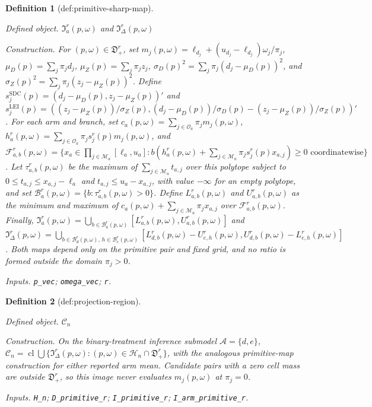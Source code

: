 \documentclass{article}
\newtheorem{definition}{Definition}
\begin{document}
\begin{definition}[def:primitive-sharp-map]\label{def:primitive-sharp-map}
\par\smallskip\noindent\emph{Defined object.} \(\mathfrak I_a^r(p,\omega)\) and \(\mathfrak I_{\Delta}^r(p,\omega)\)
\par\smallskip\noindent\emph{Construction.} For \((p,\omega)\in\mathfrak D_+^r\), set \(m_j(p,\omega)=\ell_{d_j}+(u_{d_j}-\ell_{d_j})\omega_j/\pi_j\), \(\mu_D(p)=\sum_j\pi_jd_j\), \(\mu_Z(p)=\sum_j\pi_jz_j\), \(\sigma_D(p)^2=\sum_j\pi_j(d_j-\mu_D(p))^2\), and \(\sigma_Z(p)^2=\sum_j\pi_j(z_j-\mu_Z(p))^2\). Define \(s_j^{\mathrm{SDC}}(p)=(d_j-\mu_D(p),z_j-\mu_Z(p))'\) and \(s_j^{\mathrm{LEI}}(p)=((z_j-\mu_Z(p))/\sigma_Z(p),(d_j-\mu_D(p))/\sigma_D(p)-(z_j-\mu_Z(p))/\sigma_Z(p))'\). For each arm and branch, set \(c_a(p,\omega)=\sum_{j\in\mathcal O_a}\pi_jm_j(p,\omega)\), \(h_a^r(p,\omega)=\sum_{j\in\mathcal O_a}\pi_js_j^r(p)m_j(p,\omega)\), and \(\mathcal F_{a,b}^r(p,\omega)=\{x_a\in\prod_{j\in\mathcal M_a}[\ell_a,u_a]:b(h_a^r(p,\omega)+\sum_{j\in\mathcal M_a}\pi_js_j^r(p)x_{a,j})\ge0\text{ coordinatewise}\}\). Let \(\tau_{a,b}^r(p,\omega)\) be the maximum of \(\sum_{j\in\mathcal M_a}t_{a,j}\) over this polytope subject to \(0\le t_{a,j}\le x_{a,j}-\ell_a\) and \(t_{a,j}\le u_a-x_{a,j}\), with value \(-\infty\) for an empty polytope, and set \(\mathcal B_a^r(p,\omega)=\{b:\tau_{a,b}^r(p,\omega)>0\}\). Define \(L_{a,b}^r(p,\omega)\) and \(U_{a,b}^r(p,\omega)\) as the minimum and maximum of \(c_a(p,\omega)+\sum_{j\in\mathcal M_a}\pi_jx_{a,j}\) over \(\mathcal F_{a,b}^r(p,\omega)\). Finally, \(\mathfrak I_a^r(p,\omega)=\bigcup_{b\in\mathcal B_a^r(p,\omega)}[L_{a,b}^r(p,\omega),U_{a,b}^r(p,\omega)]\) and \(\mathfrak I_{\Delta}^r(p,\omega)=\bigcup_{b\in\mathcal B_d^r(p,\omega),\,h\in\mathcal B_e^r(p,\omega)}[L_{d,b}^r(p,\omega)-U_{e,h}^r(p,\omega),U_{d,b}^r(p,\omega)-L_{e,h}^r(p,\omega)]\). Both maps depend only on the primitive pair and fixed grid, and no ratio is formed outside the domain \(\pi_j>0\).
\par\smallskip\noindent\emph{Inputs.} \texttt{p\_\allowbreak{}vec}; \texttt{omega\_\allowbreak{}vec}; \texttt{r}.
\end{definition}

\begin{definition}[def:projection-region]\label{def:projection-region}
\par\smallskip\noindent\emph{Defined object.} \(\mathcal C_n\)
\par\smallskip\noindent\emph{Construction.} On the binary-treatment inference submodel \(\mathcal A=\{d,e\}\), \(\mathcal C_n=\operatorname{cl}\bigcup\{\mathfrak I_{\Delta}^r(p,\omega):(p,\omega)\in\mathcal H_n\cap\mathfrak D_+^r\}\), with the analogous primitive-map construction for either reported arm mean. Candidate pairs with a zero cell mass are outside \(\mathfrak D_+^r\), so this image never evaluates \(m_j(p,\omega)\) at \(\pi_j=0\).
\par\smallskip\noindent\emph{Inputs.} \texttt{H\_\allowbreak{}n}; \texttt{D\_\allowbreak{}primitive\_\allowbreak{}r}; \texttt{I\_\allowbreak{}primitive\_\allowbreak{}r}; \texttt{I\_\allowbreak{}arm\_\allowbreak{}primitive\_\allowbreak{}r}.
\end{definition}
\end{document}

